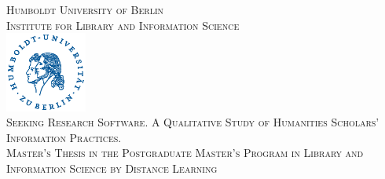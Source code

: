 \documentclass[12pt, a4paper, titlepage, oneside, abstract=true, toc=listof, toc=bibliography]{scrreprt}
\begin{document}

\begin{titlepage} %
	\newcommand{\HRule}{\rule{\linewidth}{0.5mm}} %
	
	\center %
	
	
	\textsc{\LARGE Humboldt University of Berlin}\\[1.0cm] %
	
	\textsc{\Large Institute for Library and Information Science}\\[0.5cm] %
	
	
	
	\vfill
	\includegraphics[width=0.2\textwidth]{husiegel_bw_op.eps}\\[1cm] %

	
	
	\vfill
	{\large\textsc{Seeking Research Software. A Qualitative Study of Humanities Scholars' Information Practices.}}\\[0.8cm] %
	{\textsc{Master's Thesis in the Postgraduate Master's Program in Library and Information Science by Distance Learning}}\\
	\vfill	
	

\end{titlepage}
\end{document}
